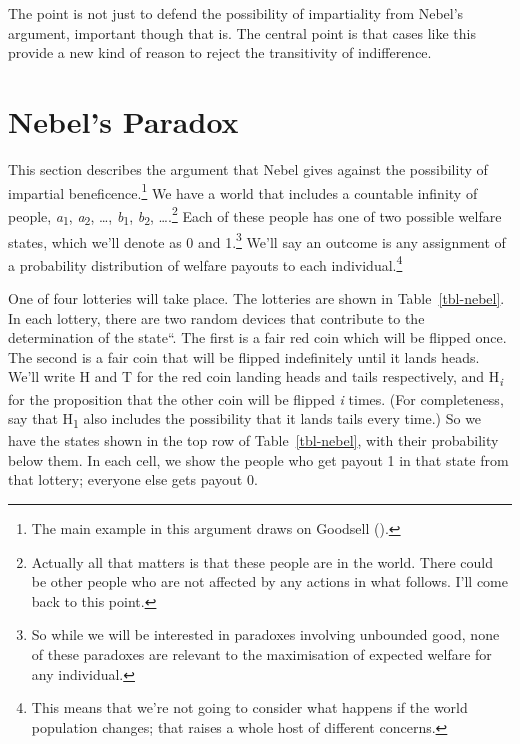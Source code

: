 \documentclass[
  11pt,
  letterpaper,
  DIV=11,
  numbers=noendperiod,
  twoside]{scrartcl}
\begin{document}
The point is not just to defend the possibility of impartiality from
Nebel's argument, important though that is. The central point is that
cases like this provide a new kind of reason to reject the transitivity
of indifference.

\section{Nebel's Paradox}\label{sec-nebel}

This section describes the argument that Nebel gives against the
possibility of impartial beneficence.\footnote{The main example in this
  argument draws on Goodsell ().} We
have a world that includes a countable infinity of people,
\emph{a}\textsubscript{1}, \emph{a}\textsubscript{2}, \ldots,
\emph{b}\textsubscript{1}, \emph{b}\textsubscript{2}, \ldots.\footnote{Actually
  all that matters is that these people are in the world. There could be
  other people who are not affected by any actions in what follows. I'll
  come back to this point.} Each of these people has one of two possible
welfare states, which we'll denote as 0 and 1.\footnote{So while we will
  be interested in paradoxes involving unbounded good, none of these
  paradoxes are relevant to the maximisation of expected welfare for any
  individual.} We'll say an outcome is any assignment of a probability
distribution of welfare payouts to each individual.\footnote{This means
  that we're not going to consider what happens if the world population
  changes; that raises a whole host of different concerns.}

One of four lotteries will take place. The lotteries are shown in
Table~\ref{tbl-nebel}. In each lottery, there are two random devices
that contribute to the determination of the state``. The first is a fair
{red} coin which will be flipped once. The second is a fair coin that
will be flipped indefinitely until it lands heads. We'll write {H} and
{T} for the {red} coin landing heads and tails respectively, and
H\textsubscript{\emph{i}} for the proposition that the other coin will
be flipped \emph{i} times. (For completeness, say that
H\textsubscript{1} also includes the possibility that it lands tails
every time.) So we have the states shown in the top row of
Table~\ref{tbl-nebel}, with their probability below them. In each cell,
we show the people who get payout 1 in that state from that lottery;
everyone else gets payout 0.
\end{document}
